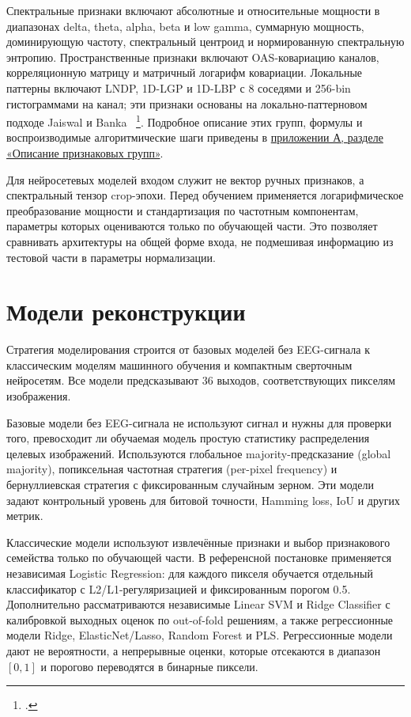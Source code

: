 Спектральные признаки включают абсолютные и относительные мощности в
диапазонах delta, theta, alpha, beta и low gamma, суммарную мощность,
доминирующую частоту, спектральный центроид и нормированную спектральную
энтропию. Пространственные признаки включают OAS-ковариацию каналов,
корреляционную матрицу и матричный логарифм ковариации. Локальные паттерны
включают LNDP, 1D-LGP и 1D-LBP с 8 соседями и 256-bin гистограммами на канал;
эти признаки основаны на локально-паттерновом подходе Jaiswal и Banka
~\footcite{10.1016/j.bspc.2017.01.005}. Подробное описание этих групп,
формулы и воспроизводимые алгоритмические шаги приведены в
\hyperref[app:feature-groups]{приложении А, разделе «Описание признаковых групп»}.

Для нейросетевых моделей входом служит не вектор ручных признаков, а
спектральный тензор crop-эпохи. Перед обучением применяется логарифмическое
преобразование мощности и стандартизация по частотным компонентам, параметры
которых оцениваются только по обучающей части. Это позволяет сравнивать
архитектуры на общей форме входа, не подмешивая информацию из тестовой части в
параметры нормализации.

\section{Модели реконструкции}

Стратегия моделирования строится от базовых моделей без EEG-сигнала к классическим
моделям машинного обучения и компактным сверточным нейросетям. Все модели
предсказывают 36 выходов, соответствующих пикселям изображения.

Базовые модели без EEG-сигнала не используют сигнал и нужны для проверки того,
превосходит ли обучаемая модель простую статистику распределения целевых
изображений. Используются глобальное majority-предсказание (global majority),
попиксельная частотная стратегия (per-pixel frequency) и бернуллиевская
стратегия с фиксированным случайным зерном. Эти модели задают
контрольный уровень для битовой точности, Hamming loss, IoU и других метрик.

Классические модели используют извлечённые признаки и выбор признакового
семейства только по обучающей части. В референсной постановке применяется независимая
Logistic Regression: для каждого пикселя обучается отдельный классификатор с
L2/L1-регуляризацией и фиксированным порогом 0.5. Дополнительно
рассматриваются независимые Linear SVM и Ridge Classifier с калибровкой
выходных оценок по out-of-fold решениям, а также регрессионные модели Ridge,
ElasticNet/Lasso, Random Forest и PLS. Регрессионные модели дают не
вероятности, а непрерывные оценки, которые отсекаются в диапазон $[0,1]$ и
порогово переводятся в бинарные пиксели.

